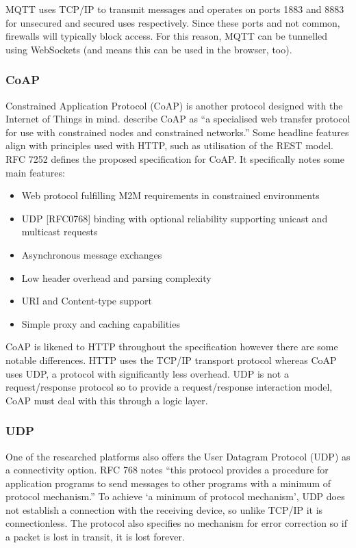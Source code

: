         MQTT uses TCP/IP to transmit messages and operates on ports 1883 and 8883 for unsecured and secured uses respectively. Since these ports and not common, firewalls will typically block access. For this reason, MQTT can be tunnelled using WebSockets (and means this can be used in the browser, too).

      \subsubsection{CoAP}
        Constrained Application Protocol (CoAP) is another protocol designed with the Internet of Things in mind. \citet{rfc7252} describe CoAP as ``a specialised web transfer protocol for use with constrained nodes and constrained networks.'' Some headline features align with principles used with HTTP, such as utilisation of the REST model. RFC 7252 defines the proposed specification for CoAP. It specifically notes some main features:

        \begin{itemize}
          \item Web protocol fulfilling M2M requirements in constrained environments
          \item UDP [RFC0768] binding with optional reliability supporting unicast and multicast requests
          \item Asynchronous message exchanges
          \item Low header overhead and parsing complexity
          \item URI and Content-type support
          \item Simple proxy and caching capabilities
        \end{itemize}

        CoAP is likened to HTTP throughout the specification however there are some notable differences. HTTP uses the TCP/IP transport protocol whereas CoAP uses UDP, a protocol with significantly less overhead. UDP is not a request/response protocol so to provide a request/response interaction model, CoAP must deal with this through a logic layer.

      \subsubsection{UDP}
        One of the researched platforms also offers the User Datagram Protocol (UDP) as a connectivity option. RFC 768 \citep{rfc768} notes ``this protocol provides a procedure for application programs to send messages to other programs with a minimum of protocol mechanism.'' To achieve `a minimum of protocol mechanism', UDP does not establish a connection with the receiving device, so unlike TCP/IP it is connectionless. The protocol also specifies no mechanism for error correction so if a packet is lost in transit, it is lost forever.


